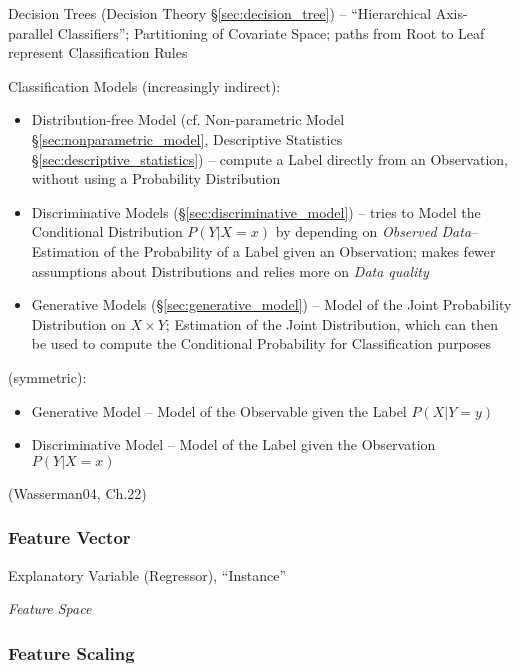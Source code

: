 \fist Decision Trees (Decision Theory \S\ref{sec:decision_tree}) --
``Hierarchical Axis-parallel Classifiers''; Partitioning of Covariate Space;
paths from Root to Leaf represent Classification Rules

Classification Models (increasingly indirect):
\begin{itemize}
  \item Distribution-free Model (cf. Non-parametric Model
    \S\ref{sec:nonparametric_model}, Descriptive Statistics
    \S\ref{sec:descriptive_statistics}) -- compute a Label directly from an
    Observation, without using a Probability Distribution
  \item Discriminative Models (\S\ref{sec:discriminative_model}) -- tries to
    Model the Conditional Distribution $P(Y|X = x)$ by depending on
    \emph{Observed Data}-- Estimation of the Probability of a Label given an
    Observation; makes fewer assumptions about Distributions and relies
    more on \emph{Data quality}
  \item Generative Models (\S\ref{sec:generative_model}) -- Model of the
    Joint Probability Distribution on $X \times Y$; Estimation of the Joint
    Distribution, which can then be used to compute the Conditional Probability
    for Classification purposes
\end{itemize}

(symmetric):
\begin{itemize}
  \item Generative Model -- Model of the Observable given the Label $P(X|Y = y)$
  \item Discriminative Model -- Model of the Label given the Observation
    $P(Y|X = x)$
\end{itemize}

(Wasserman04, Ch.22)



\subsubsection{Feature Vector}\label{sec:feature_vector}

Explanatory Variable (Regressor), ``Instance''

\emph{Feature Space}



\subsubsection{Feature Scaling}\label{sec:feature_scaling}


